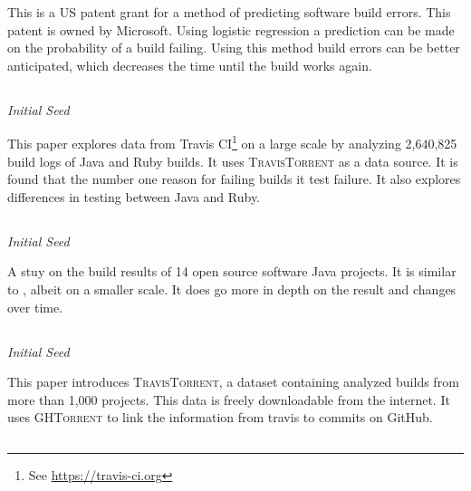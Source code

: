 \documentclass[]{book}
\let\rmarkdownfootnote\footnote%
\def\footnote{\protect\rmarkdownfootnote}
\begin{document}
This is a US patent grant for a method of predicting software build
errors. This patent is owned by Microsoft. Using logistic regression a
prediction can be made on the probability of a build failing. Using this
method build errors can be better anticipated, which decreases the time
until the build works again.

\subsection{\texorpdfstring{\citet{beller2017oops}}{@beller2017oops}}\label{beller2017oops}

\emph{Initial Seed}

This paper explores data from Travis CI\footnote{See
  \url{https://travis-ci.org}} on a large scale by analyzing 2,640,825
build logs of Java and Ruby builds. It uses \textsc{TravisTorrent} as a
data source. It is found that the number one reason for failing builds
it test failure. It also explores differences in testing between Java
and Ruby.

\subsection{\texorpdfstring{\citet{rausch2017empirical}}{@rausch2017empirical}}\label{rausch2017empirical}

\emph{Initial Seed}

A stuy on the build results of 14 open source software Java projects. It
is similar to \citet{beller2017oops}, albeit on a smaller scale. It does
go more in depth on the result and changes over time.

\subsection{\texorpdfstring{\citet{beller2017travistorrent}}{@beller2017travistorrent}}\label{beller2017travistorrent}

\emph{Initial Seed}

This paper introduces \textsc{TravisTorrent}, a dataset containing
analyzed builds from more than 1,000 projects. This data is freely
downloadable from the internet. It uses \textsc{GHTorrent} to link the
information from travis to commits on GitHub.

\subsection{\texorpdfstring{\citet{pinto2018work}}{@pinto2018work}}\label{pinto2018work}
\end{document}
